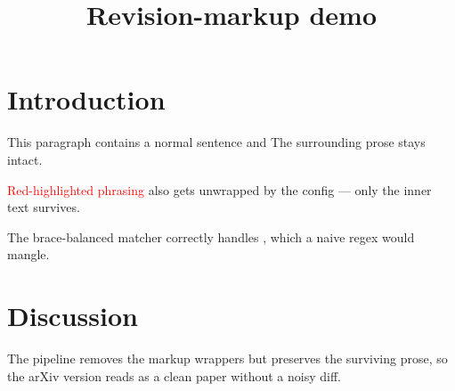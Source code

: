 \documentclass{article}
\title{Revision-markup demo}
\begin{document}
\maketitle

\section{Introduction}
This paragraph contains a normal sentence
and  The surrounding prose stays
intact.

\textcolor{red}{Red-highlighted phrasing} also gets unwrapped by the
config — only the inner text survives.

The brace-balanced matcher correctly handles
,
which a naive regex would mangle.

\section{Discussion}
The pipeline removes the markup wrappers but preserves the surviving
prose, so the arXiv version reads as a clean paper without a noisy diff.
\end{document}
